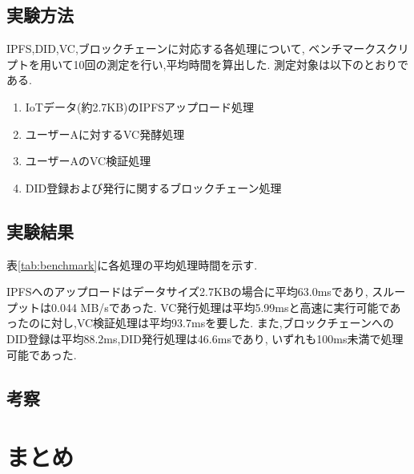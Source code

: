 \documentclass[a4paper,9pt,twocolumn]{ltjsarticle} %
\begin{document}
\subsection{実験方法}
IPFS,DID,VC,ブロックチェーンに対応する各処理について,
ベンチマークスクリプトを用いて10回の測定を行い,平均時間を算出した.
測定対象は以下のとおりである.

\begin{enumerate}
  \item IoTデータ(約2.7KB)のIPFSアップロード処理
  \item ユーザーAに対するVC発酵処理
  \item ユーザーAのVC検証処理
  \item DID登録および発行に関するブロックチェーン処理
\end{enumerate}

\subsection{実験結果}
表\ref{tab:benchmark}に各処理の平均処理時間を示す.

\begin{table}[H]
  \centering
  \caption{各処理のベンチマーク結果(平均値)}
  \label{tab:benchmark}
\end{table}

IPFSへのアップロードはデータサイズ2.7KBの場合に平均63.0msであり,
スループットは0.044 MB/sであった.
VC発行処理は平均5.99msと高速に実行可能であったのに対し,VC検証処理は平均93.7msを要した.
また,ブロックチェーンへのDID登録は平均88.2ms,DID発行処理は46.6msであり,
いずれも100ms未満で処理可能であった.

\subsection{考察}

\section{まとめ}



\end{document}
